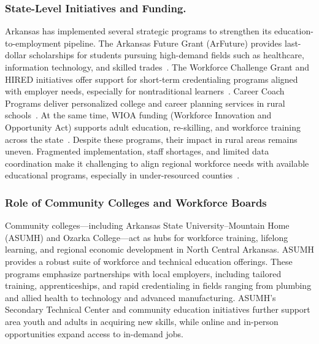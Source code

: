 \documentclass{llncs}
\begin{document}
\subsubsection{\textbf{State-Level Initiatives and Funding.}}
Arkansas has implemented several strategic programs to strengthen its education-to-employment pipeline. The Arkansas Future Grant (ArFuture) provides last-dollar scholarships for students pursuing high-demand fields such as healthcare, information technology, and skilled trades~\cite{adhe_workforce_2025}. The Workforce Challenge Grant and HIRED initiatives offer support for short-term credentialing programs aligned with employer needs, especially for nontraditional learners~\cite{adhe_workforce_2025,sanders_hired_2024,ua_system_hired_2024}. Career Coach Programs deliver personalized college and career planning services in rural schools~\cite{careercoach_ade_2025,rooted_arkansas_2025}. At the same time, WIOA funding (Workforce Innovation and Opportunity Act) supports adult education, re-skilling, and workforce training across the state~\cite{wioa_dws_2025,dol_wioa_waiver_2024}. Despite these programs, their impact in rural areas remains uneven. Fragmented implementation, staff shortages, and limited data coordination make it challenging to align regional workforce needs with available educational programs, especially in under-resourced counties~\cite{nrea_arkansas_2024,forward_rural_arkansas_2025}.


\subsubsection{Role of Community Colleges and Workforce Boards}\label{subsec:Role_comCollege}

Community colleges—including Arkansas State University–Mountain Home (ASUMH)\cite{asumh_homepage_2025,asumh_workforce_2025} and Ozarka College\cite{ozarka_homepage_2025,ozarka_news_2025}—act as hubs for workforce training, lifelong learning, and regional economic development in North Central Arkansas. ASUMH provides a robust suite of workforce and technical education offerings. These programs emphasize partnerships with local employers, including tailored training, apprenticeships, and rapid credentialing in fields ranging from plumbing and allied health to technology and advanced manufacturing\cite{asumh_workforce_2025,asumh_homepage_2025,asumh_commed_2025}. ASUMH’s Secondary Technical Center and community education initiatives further support area youth and adults in acquiring new skills, while online and in-person opportunities expand access to in-demand jobs\cite{asumh_workforce_2025,asumh_commed_2025}.
\end{document}
